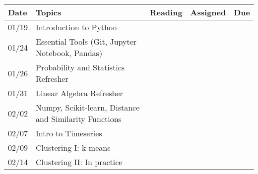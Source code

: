 \documentclass[11pt]{article}
\begin{document}
\small
\begin{centering}
\begin{tabular}{||l|p{3in}|l|l|l||}
\hline\hline
Date & Topics  & Reading & Assigned & Due  \\
\hline\hline
01/19 & Introduction to Python &  &  & \\
\hline
01/24 & Essential Tools (Git, Jupyter Notebook, Pandas) & & & \\
01/26 & Probability and Statistics Refresher & &  & \\
\hline
01/31 & Linear Algebra Refresher & & & \\

 02/02 & Numpy, Scikit-learn, Distance and Similarity Functions & &  & \\
\hline
 02/07 & Intro to Timeseries & & & \\ 
02/09 & Clustering I: k-means & & & \\
\hline
02/14 & Clustering II: In practice & &  & \\ 


\end{tabular}
\end{centering}
\end{document}
